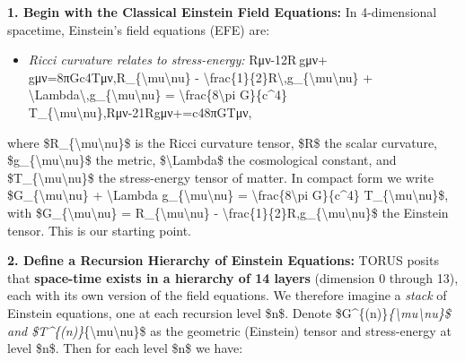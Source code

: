 \documentclass[
]{article}
\begin{document}
\textbf{1. Begin with the Classical Einstein Field Equations:} In
4-dimensional spacetime, Einstein's field equations (EFE) are:

\begin{itemize}
\item
  \emph{Ricci curvature relates to stress-energy:}
  Rμν-12R gμν+\Lambda gμν=8πGc4Tμν,R\_\{\textbackslash mu\textbackslash nu\} -
  \textbackslash frac\{1\}\{2\}R\textbackslash,g\_\{\textbackslash mu\textbackslash nu\}
  +
  \textbackslash Lambda\textbackslash,g\_\{\textbackslash mu\textbackslash nu\}
  = \textbackslash frac\{8\textbackslash pi G\}\{c\^{}4\}
  T\_\{\textbackslash mu\textbackslash nu\},Rμν\hspace{0pt}-21\hspace{0pt}Rgμν\hspace{0pt}+\hspace{0pt}=c48πG\hspace{0pt}Tμν\hspace{0pt},
\end{itemize}

where \$R\_\{\textbackslash mu\textbackslash nu\}\$ is the Ricci
curvature tensor, \$R\$ the scalar curvature,
\$g\_\{\textbackslash mu\textbackslash nu\}\$ the metric,
\$\textbackslash Lambda\$ the cosmological constant, and
\$T\_\{\textbackslash mu\textbackslash nu\}\$ the stress-energy tensor
of matter. In compact form we write
\$G\_\{\textbackslash mu\textbackslash nu\} + \textbackslash Lambda
g\_\{\textbackslash mu\textbackslash nu\} =
\textbackslash frac\{8\textbackslash pi G\}\{c\^{}4\}
T\_\{\textbackslash mu\textbackslash nu\}\$, with
\$G\_\{\textbackslash mu\textbackslash nu\} =
R\_\{\textbackslash mu\textbackslash nu\} -
\textbackslash frac\{1\}\{2\}R,g\_\{\textbackslash mu\textbackslash nu\}\$
the Einstein tensor. This is our starting point\hspace{0pt}.

\textbf{2. Define a Recursion Hierarchy of Einstein Equations:} TORUS
posits that \textbf{space-time exists in a hierarchy of 14 layers}
(dimension 0 through 13), each with its own version of the field
equations\hspace{0pt}. We therefore imagine a \emph{stack} of Einstein
equations, one at each recursion level \$n\$. Denote
\$G\^{}\{(n)\}\emph{\{\textbackslash mu\textbackslash nu\}\$ and
\$T\^{}\{(n)\}}\{\textbackslash mu\textbackslash nu\}\$ as the geometric
(Einstein) tensor and stress-energy at level \$n\$. Then for each level
\$n\$ we have:
\end{document}
